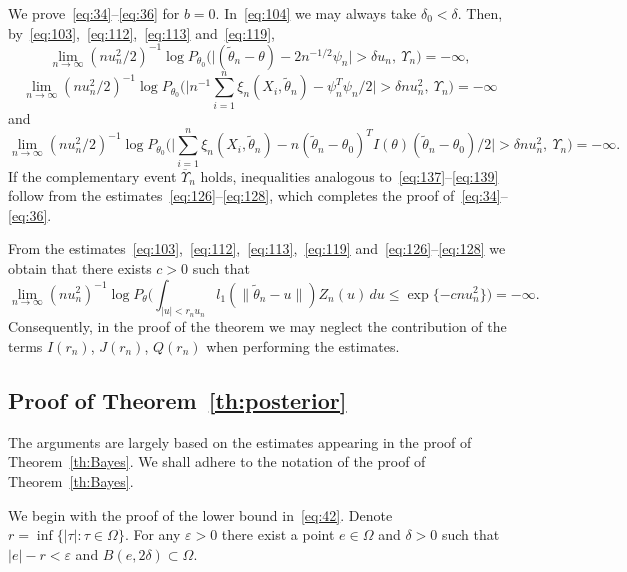 \documentclass[11pt,a4paper]{article}
\begin{document}
We prove~\eqref{eq:34}--\eqref{eq:36} for $b=0$. In~\eqref{eq:104} we may always take $\delta_0<\delta$. Then, by~\eqref{eq:103},~\eqref{eq:112},~\eqref{eq:113} and~\eqref{eq:119},
\begin{equation}
\lim_{n\to\infty}(nu_n^2/2)^{-1}\log P_{\theta_0}\bigl(\bigl|(\tilde\theta_n-\theta)-2n^{-1/2}\psi_n\bigr|>\delta u_n,\ \Upsilon_n\bigr)=-\infty,
\label{eq:137}
\end{equation}
\begin{equation}
\lim_{n\to\infty}(nu_n^2/2)^{-1}\log P_{\theta_0}\Biggl(\Biggl|n^{-1}\sum_{i=1}^n\xi_n(X_i,\tilde\theta_n)-\psi_n^T\psi_n/2\Biggr|>\delta nu_n^2,\ \Upsilon_n\Biggr)=-\infty
\label{eq:138}
\end{equation}
and
\begin{equation}
\lim_{n\to\infty}(nu_n^2/2)^{-1}\log P_{\theta_0}\Biggl(\Biggl|\sum_{i=1}^n\xi_n(X_i,\tilde\theta_n)
-n(\tilde\theta_n-\theta_0)^TI(\theta)(\tilde\theta_n-\theta_0)/2\Biggr|>\delta nu_n^2,\ \Upsilon_n\Biggr)=-\infty.
\label{eq:139}
\end{equation}
If the complementary event $\overline{\Upsilon}_n$ holds, inequalities analogous to~\eqref{eq:137}--\eqref{eq:139} follow from the estimates~\eqref{eq:126}--\eqref{eq:128}, which completes the proof of~\eqref{eq:34}--\eqref{eq:36}.

From the estimates~\eqref{eq:103},~\eqref{eq:112},~\eqref{eq:113},~\eqref{eq:119} and~\eqref{eq:126}--\eqref{eq:128} we obtain that there exists $c>0$ such that
\begin{equation}
\lim_{n\to\infty}(nu_n^2)^{-1}\log P_\theta\Biggl(\int_{|u|<r_nu_n}l_1(\|\tilde\theta_n-u\|)Z_n(u)\,du\le\exp\{-cnu_n^2\}\Biggr)=-\infty.
\label{eq:140}
\end{equation}
Consequently, in the proof of the theorem we may neglect the contribution of the terms $I(r_n)$, $J(r_n)$, $Q(r_n)$ when performing the estimates.

\subsection{Proof of Theorem~\ref{th:posterior}}

The arguments are largely based on the estimates appearing in the proof of Theorem~\ref{th:Bayes}. We shall adhere to the notation of the proof of Theorem~\ref{th:Bayes}.

We begin with the proof of the lower bound in~\eqref{eq:42}. Denote $r=\inf\{|\tau|:\tau\in\Omega\}$. For any $\varepsilon>0$ there exist a point $e\in\Omega$ and $\delta>0$ such that $|e|-r<\varepsilon$ and $B(e,2\delta)\subset\Omega$.
\end{document}
